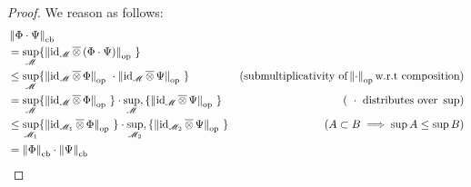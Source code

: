 \begin{proof}
  We reason as follows:
  \begin{equation*}
  \begin{split}
   & \left\lVert \Phi \cdot \Psi \right\rVert_{\text{cb}}  \\
  & = \sup_{\mathscr{M}} \{ \left\lVert \mathrm{id}_\mathscr{M} \, \overline{\otimes} \, (\Phi \cdot \Psi) \right\rVert_{\text{op}}\ \} \\
  & \leq \sup_{\mathscr{M}} \{ \left\lVert \mathrm{id}_\mathscr{M} \, \overline{\otimes} \, \Phi  \right\rVert_{\text{op}}\ \cdot  \left\lVert \mathrm{id}_\mathscr{M} \, \overline{\otimes} \,  \Psi \right\rVert_{\text{op}}\ \} & (\text{submultiplicativity of} \left\lVert \cdot \right\rVert_{\text{op}}  \text{w.r.t composition}) \\
  & = \sup_{\mathscr{M}} \{ \left\lVert \mathrm{id}_{\mathscr{M}} \, \overline{\otimes} \, \Phi  \right\rVert_{\text{op}}\ \} \cdot \sup_{\mathscr{M}}, \{ \left\lVert \mathrm{id}_{\mathscr{M}}\, \overline{\otimes} \,  \Psi \right\rVert_{\text{op}}\ \} & (\text{ }\cdot \text{  distributes over  } \sup)  \\
  & \leq \sup_{\mathscr{M}_1} \{ \left\lVert \mathrm{id}_{\mathscr{M}_1} \, \overline{\otimes} \, \Phi  \right\rVert_{\text{op}}\ \} \cdot \sup_{\mathscr{M}_2}, \{ \left\lVert \mathrm{id}_{\mathscr{M}_2}\, \overline{\otimes} \,  \Psi \right\rVert_{\text{op}}\ \}& (A \subset B \implies \sup A \leq \sup B) \\
    & = \left\lVert \Phi \right\rVert_{\text{cb}} \cdot  \left\lVert \Psi \right\rVert_{\text{cb}} 
  \end{split}
  \end{equation*}

\end{proof}

